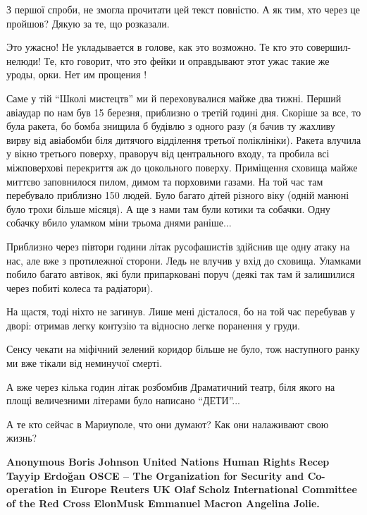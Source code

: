 \begin{itemize}

З першої спроби, не змогла прочитати цей текст повністю. А як тим, хто через це
пройшов? Дякую за те, що розказали.


Это ужасно! Не укладывается в голове, как это возможно. Те кто это совершил-
нелюди! Те, кто говорит, что это фейки и оправдывают этот ужас такие же уроды,
орки. Нет им прощения !


Саме у тій \enquote{Школі мистецтв} ми й переховувалися майже два тижні. Перший
авіаудар по нам був 15 березня, приблизно о третій годині дня. Скоріше за все,
то була ракета, бо бомба знищила б будівлю з одного разу (я бачив ту жахливу
вирву від авіабомби біля дитячого відділення третьої поліклініки). Ракета
влучила у вікно третього поверху, праворуч від центрального входу, та пробила
всі міжповерхові перекриття аж до цокольного поверху. Приміщення сховища майже
миттєво заповнилося пилом, димом та порховими газами. На той час там перебувало
приблизно 150 людей. Було багато дітей різного віку (одній манюні було трохи
більше місяця). А ще з нами там були котики та собачки. Одну собачку вбило
уламком міни трьома днями раніше...

Приблизно через півтори години літак русофашистів здійснив ще одну атаку на
нас, але вже з протилежної сторони. Ледь не влучив у вхід до сховища. Уламками
побило багато автівок, які були припарковані поруч (деякі так там й залишилися
через побиті колеса та радіатори).

На щастя, тоді ніхто не загинув. Лише мені дісталося, бо на той час перебував у
дворі: отримав легку контузію та відносно легке поранення у груди.

Сенсу чекати на міфічний зелений коридор більше не було, тож наступного ранку
ми вже тікали від неминучої смерті.

А вже через кілька годин літак розбомбив Драматичний театр, біля якого на площі
величезними літерами було написано \enquote{ДЕТИ}...


А те кто сейчас в Мариуполе, что они думают? Как они налаживают свою жизнь?


\obeycr
\bfseries
Anonymous
Boris Johnson
United Nations Human Rights
Recep Tayyip Erdoğan
OSCE – The Organization for Security and Co-operation in Europe
Reuters UK
Olaf Scholz
International Committee of the Red Cross
ElonMusk
Emmanuel Macron
Angelina Jolie.
\restorecr


\end{itemize}

